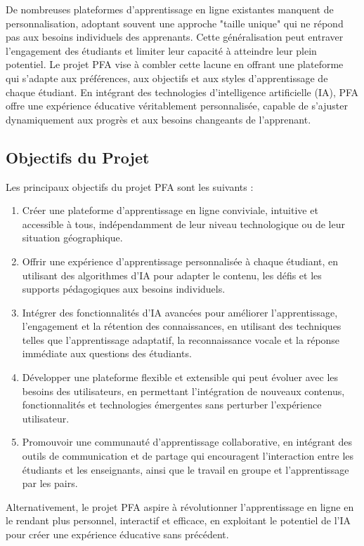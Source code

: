De nombreuses plateformes d'apprentissage en ligne existantes manquent de personnalisation, adoptant souvent une approche "taille unique" qui ne répond pas aux besoins individuels des apprenants. Cette généralisation peut entraver l'engagement des étudiants et limiter leur capacité à atteindre leur plein potentiel. Le projet \gls{PFA} vise à combler cette lacune en offrant une plateforme qui s'adapte aux préférences, aux objectifs et aux styles d'apprentissage de chaque étudiant. En intégrant des technologies d'intelligence artificielle (\gls{IA}), \gls{PFA} offre une expérience éducative véritablement personnalisée, capable de s'ajuster dynamiquement aux progrès et aux besoins changeants de l'apprenant.
\newline

\subsection*{Objectifs du Projet}

Les principaux objectifs du projet \gls{PFA} sont les suivants :

\begin{enumerate}[label=\Roman*.]

    \item Créer une plateforme d'apprentissage en ligne conviviale, intuitive et accessible à tous, indépendamment de leur niveau technologique ou de leur situation géographique.
    \item Offrir une expérience d'apprentissage personnalisée à chaque étudiant, en utilisant des algorithmes d'\gls{IA} pour adapter le contenu, les défis et les supports pédagogiques aux besoins individuels.
    \item Intégrer des fonctionnalités d'\gls{IA} avancées pour améliorer l'apprentissage, l'engagement et la rétention des connaissances, en utilisant des techniques telles que l'apprentissage adaptatif, la reconnaissance vocale et la réponse immédiate aux questions des étudiants.
    \item Développer une plateforme flexible et extensible qui peut évoluer avec les besoins des utilisateurs, en permettant l'intégration de nouveaux contenus, fonctionnalités et technologies émergentes sans perturber l'expérience utilisateur.
    \item Promouvoir une communauté d'apprentissage collaborative, en intégrant des outils de communication et de partage qui encouragent l'interaction entre les étudiants et les enseignants, ainsi que le travail en groupe et l'apprentissage par les pairs.

\end{enumerate}
Alternativement, le projet \gls{PFA} aspire à révolutionner l'apprentissage en ligne en le rendant plus personnel, interactif et efficace, en exploitant le potentiel de l'\gls{IA} pour créer une expérience éducative sans précédent.



